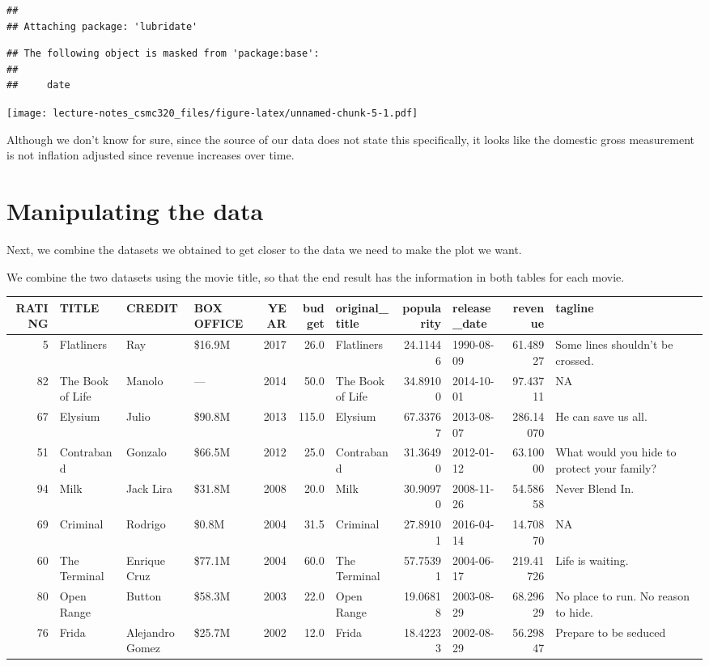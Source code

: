 \documentclass[12pt,]{book}
\theoremstyle{definition}
\theoremstyle{definition}
\theoremstyle{definition}
\theoremstyle{remark}
\begin{document}
\begin{verbatim}
## 
## Attaching package: 'lubridate'
\end{verbatim}

\begin{verbatim}
## The following object is masked from 'package:base':
## 
##     date
\end{verbatim}

\texttt{[image: lecture-notes\_csmc320\_files/figure-latex/unnamed-chunk-5-1.pdf]}

Although we don't know for sure, since the source of our data does not
state this specifically, it looks like the domestic gross measurement is
not inflation adjusted since revenue increases over time.

\section{Manipulating the data}\label{manipulating-the-data}

Next, we combine the datasets we obtained to get closer to the data we
need to make the plot we want.

We combine the two datasets using the movie title, so that the end
result has the information in both tables for each movie.

\begin{tabular}{r|l|l|l|r|r|l|r|l|r|l}
\hline
RATING & TITLE & CREDIT & BOX OFFICE & YEAR & budget & original\_title & popularity & release\_date & revenue & tagline\\
\hline
5 & Flatliners & Ray & \$16.9M & 2017 & 26.0 & Flatliners & 24.11446 & 1990-08-09 & 61.48927 & Some lines shouldn't be crossed.\\
\hline
82 & The Book of Life & Manolo & — & 2014 & 50.0 & The Book of Life & 34.89100 & 2014-10-01 & 97.43711 & NA\\
\hline
67 & Elysium & Julio & \$90.8M & 2013 & 115.0 & Elysium & 67.33767 & 2013-08-07 & 286.14070 & He can save us all.\\
\hline
51 & Contraband & Gonzalo & \$66.5M & 2012 & 25.0 & Contraband & 31.36490 & 2012-01-12 & 63.10000 & What would you hide to protect your family?\\
\hline
94 & Milk & Jack Lira & \$31.8M & 2008 & 20.0 & Milk & 30.90970 & 2008-11-26 & 54.58658 & Never Blend In.\\
\hline
69 & Criminal & Rodrigo & \$0.8M & 2004 & 31.5 & Criminal & 27.89101 & 2016-04-14 & 14.70870 & NA\\
\hline
60 & The Terminal & Enrique Cruz & \$77.1M & 2004 & 60.0 & The Terminal & 57.75391 & 2004-06-17 & 219.41726 & Life is waiting.\\
\hline
80 & Open Range & Button & \$58.3M & 2003 & 22.0 & Open Range & 19.06818 & 2003-08-29 & 68.29629 & No place to run. No reason to hide.\\
\hline
76 & Frida & Alejandro Gomez & \$25.7M & 2002 & 12.0 & Frida & 18.42233 & 2002-08-29 & 56.29847 & Prepare to be seduced\\
\hline
\end{tabular}
\end{document}
